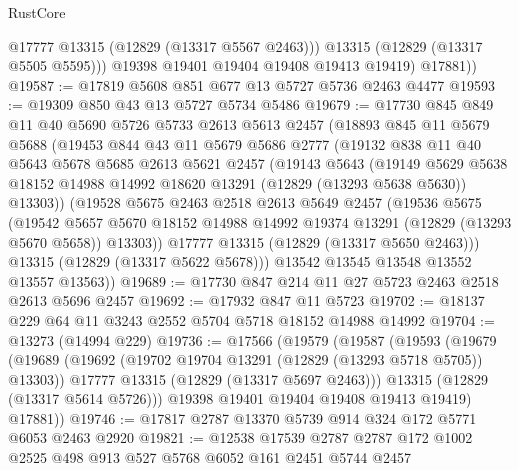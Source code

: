 \begin{lexlean}{RustCore}
\begin{coremodule}
              @17777
              @13315
              (@12829 (@13317 @5567 @2463)))
            @13315
            (@12829 (@13317 @5505 @5595)))
          @19398
          @19401
          @19404
          @19408
          @19413
          @19419)
        @17881))
@19587 := @17819 @5608 @851 @677 @13 @5727 @5736 @2463 @4477
@19593 := @19309 @850 @43 @13 @5727 @5734 @5486
@19679 := @17730
    @845
    @849
    @11
    @40
    @5690
    @5726
    @5733
    @2613
    @5613
    @2457
    (@18893
      @845
      @11
      @5679
      @5688
      (@19453
        @844
        @43
        @11
        @5679
        @5686
        @2777
        (@19132
          @838
          @11
          @40
          @5643
          @5678
          @5685
          @2613
          @5621
          @2457
          (@19143
            @5643
            (@19149
              @5629
              @5638
              @18152
              @14988
              @14992
              @18620
              @13291
              (@12829 (@13293 @5638 @5630))
              @13303))
          (@19528
            @5675
            @2463
            @2518
            @2613
            @5649
            @2457
            (@19536
              @5675
              (@19542
                @5657
                @5670
                @18152
                @14988
                @14992
                @19374
                @13291
                (@12829 (@13293 @5670 @5658))
                @13303))
            @17777
            @13315
            (@12829 (@13317 @5650 @2463)))
          @13315
          (@12829 (@13317 @5622 @5678)))
        @13542
        @13545
        @13548
        @13552
        @13557
        @13563))
@19689 := @17730 @847 @214 @11 @27 @5723 @2463 @2518 @2613 @5696 @2457
@19692 := @17932 @847 @11 @5723
@19702 := @18137 @229 @64 @11 @3243 @2552 @5704 @5718 @18152 @14988 @14992
@19704 := @13273 (@14994 @229)
@19736 := @17566
    (@19579
      (@19587
        (@19593
          (@19679
            (@19689
              (@19692 (@19702 @19704 @13291 (@12829 (@13293 @5718 @5705)) @13303))
              @17777
              @13315
              (@12829 (@13317 @5697 @2463)))
            @13315
            (@12829 (@13317 @5614 @5726)))
          @19398
          @19401
          @19404
          @19408
          @19413
          @19419)
        @17881))
@19746 := @17817 @2787 @13370 @5739 @914 @324 @172 @5771 @6053 @2463 @2920
@19821 := @12538
    @17539
    @2787
    @2787
    @172
    @1002
    @2525
    @498
    @913
    @527
    @5768
    @6052
    @161
    @2451
    @5744
    @2457

\end{coremodule}
\end{lexlean}
